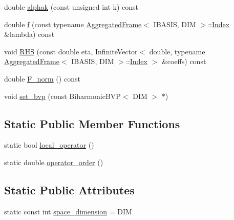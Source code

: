 \begin{CompactItemize}
\item 
double \hyperlink{classFrameTL_1_1BiharmonicEquation_9f424ae1bc3dbcc5490e6bd77240c71c}{alphak} (const unsigned int k) const 
\item 
double \hyperlink{classFrameTL_1_1BiharmonicEquation_0b477b96020f82cbccb11d904acbaf3e}{f} (const typename \hyperlink{classFrameTL_1_1AggregatedFrame}{AggregatedFrame}$<$ IBASIS, DIM $>$::\hyperlink{classFrameTL_1_1FrameIndex}{Index} \&lambda) const 
\item 
void \hyperlink{classFrameTL_1_1BiharmonicEquation_032b924e5b4f43048535d3f2544eb27d}{RHS} (const double eta, InfiniteVector$<$ double, typename \hyperlink{classFrameTL_1_1AggregatedFrame}{AggregatedFrame}$<$ IBASIS, DIM $>$::\hyperlink{classFrameTL_1_1FrameIndex}{Index} $>$ \&coeffs) const 
\item 
double \hyperlink{classFrameTL_1_1BiharmonicEquation_8a83415dd882a4f51ceeaa46c988462f}{F\_\-norm} () const 
\item 
void \hyperlink{classFrameTL_1_1BiharmonicEquation_cf2416d4c035dbe3edf426d8ca032c0f}{set\_\-bvp} (const BiharmonicBVP$<$ DIM $>$ $\ast$)
\end{CompactItemize}
\subsection*{Static Public Member Functions}
\begin{CompactItemize}
\item 
static bool \hyperlink{classFrameTL_1_1BiharmonicEquation_9d20dc4a94ba5719b1a25c92e8faba10}{local\_\-operator} ()
\item 
static double \hyperlink{classFrameTL_1_1BiharmonicEquation_89f12c9466f7e91a5dc94c45525ee17f}{operator\_\-order} ()
\end{CompactItemize}
\subsection*{Static Public Attributes}
\begin{CompactItemize}
\item 
static const int \hyperlink{classFrameTL_1_1BiharmonicEquation_8c79fee355dd2f68f56cd70a94e55511}{space\_\-dimension} = DIM
\end{CompactItemize}
